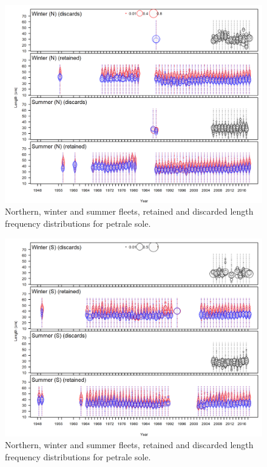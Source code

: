 \documentclass[12pt,]{article}
\begin{document}
\FloatBarrier

\FloatBarrier

\begin{figure}
\centering
\includegraphics{r4ss/plots_mod1/comp_lendat__page1_multi-fleet_comparison.png}
\caption{Northern, winter and summer fleets, retained and discarded
length frequency distributions for petrale sole.
\label{fig:north_lengths}}
\end{figure}

\FloatBarrier

\begin{figure}
\centering
\includegraphics{r4ss/plots_mod1/comp_lendat__page2_multi-fleet_comparison.png}
\caption{Northern, winter and summer fleets, retained and discarded
length frequency distributions for petrale sole.
\label{fig:south_lengths}}
\end{figure}
\end{document}
